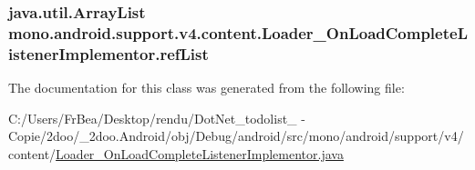 \hypertarget{classmono_1_1android_1_1support_1_1v4_1_1content_1_1_loader___on_load_complete_listener_implementor_6226d0b44e4a2bf969793881e5cb6a55}{
\subsubsection[{refList}]{\setlength{\rightskip}{0pt plus 5cm}java.util.ArrayList {\bf mono.android.support.v4.content.Loader\_\-OnLoadCompleteListenerImplementor.refList}}}
\label{classmono_1_1android_1_1support_1_1v4_1_1content_1_1_loader___on_load_complete_listener_implementor_6226d0b44e4a2bf969793881e5cb6a55}




The documentation for this class was generated from the following file:\begin{CompactItemize}
\item 
C:/Users/FrBea/Desktop/rendu/DotNet\_\-todolist\_ - Copie/2doo/\_\-2doo.Android/obj/Debug/android/src/mono/android/support/v4/content/\hyperlink{_loader___on_load_complete_listener_implementor_8java}{Loader\_\-OnLoadCompleteListenerImplementor.java}\end{CompactItemize}
